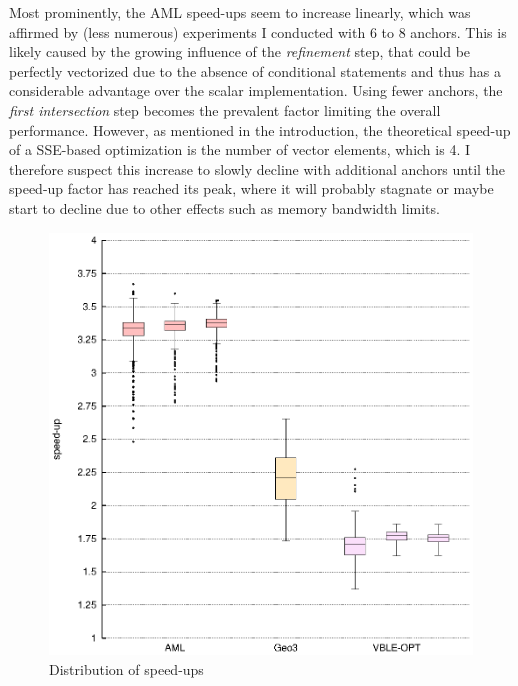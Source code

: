 Most prominently, the AML speed-ups seem to increase linearly, which was affirmed by (less numerous) experiments I conducted with 6 to 8 anchors. This is likely caused by the growing influence of the \emph{refinement} step, that could be perfectly vectorized due to the absence of conditional statements and thus has a considerable advantage over the scalar implementation. Using fewer anchors, the \emph{first intersection} step becomes the prevalent factor limiting the overall performance. However, as mentioned in the introduction, the theoretical speed-up of a SSE-based optimization is the number of vector elements, which is 4. I therefore suspect this increase to slowly decline with additional anchors until the speed-up factor has reached its peak, where it will probably stagnate or maybe start to decline due to other effects such as memory bandwidth limits.

\begin{figure}
\begin{center}
\includegraphics{img/boxplot}
\end{center}
\caption{Distribution of speed-ups}
\label{fig:boxplot}
\end{figure}

